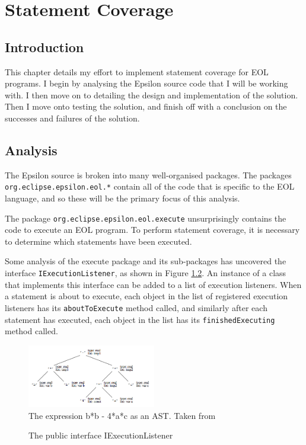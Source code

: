 \chapter{Statement Coverage}
\label{chap:statement}

\section{Introduction}

This chapter details my effort to implement statement coverage for EOL programs. I begin by analysing the Epsilon source code that I will be working with. I then move on to detailing the design and implementation of the solution. Then I move onto testing the solution, and finish off with a conclusion on the successes and failures of the solution.

\section{Analysis}

The Epsilon source is broken into many well-organised packages. The packages \verb+org.eclipse.epsilon.eol.*+ contain all of the code that is specific to the EOL language, and so these will be the primary focus of this analysis.

The package \verb+org.eclipse.epsilon.eol.execute+ unsurprisingly contains the code to execute an EOL program. To perform statement coverage, it is necessary to determine which statements have been executed. 

Some analysis of the execute package and its sub-packages has uncovered the interface \verb+IExecutionListener+, as shown in Figure \ref{lst:IExecutionListener}. An instance of a class that implements this interface can be added to a list of execution listeners. When a statement is about to execute, each object in the list of registered execution listeners has its \verb+aboutToExecute+ method called, and similarly after each statement has executed, each object in the list has its \verb+finishedExecuting+ method called.

\begin{figure}
\centering
\includegraphics[width=0.5\textwidth]{figures/AST.png}
\caption{The expression b*b - 4*a*c as an AST. Taken from \citep{grune2000modern}}
\label{fig:AST}
\end{figure}
\begin{figure}
	
	\caption{The public interface IExecutionListener}
	\label{lst:IExecutionListener}
\end{figure}

